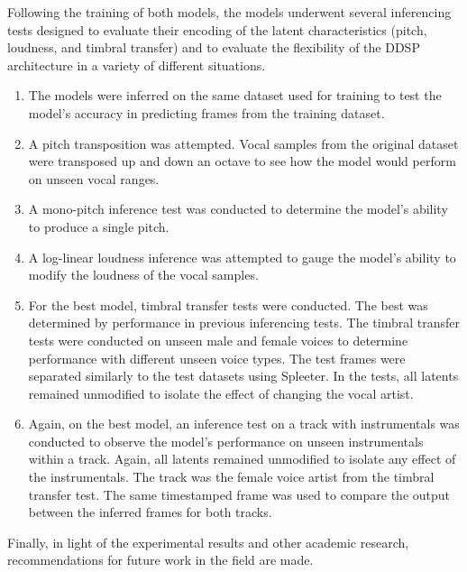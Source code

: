 Following the training of both models, the models underwent several inferencing tests designed to evaluate their encoding of the latent characteristics (pitch, loudness, and timbral transfer) and to evaluate the flexibility of the DDSP architecture in a variety of different situations.

\begin{enumerate}
    \item The models were inferred on the same dataset used for training to test the model's accuracy in predicting frames from the training dataset.
    \item A pitch transposition was attempted. Vocal samples from the original dataset were transposed up and down an octave to see how the model would perform on unseen vocal ranges.
    \item A mono-pitch inference test was conducted to determine the model's ability to produce a single pitch.
    \item A log-linear loudness inference was attempted to gauge the model's ability to modify the loudness of the vocal samples.
    \item For the best model, timbral transfer tests were conducted. The best was determined by performance in previous inferencing tests. The timbral transfer tests were conducted on unseen male and female voices to determine performance with different unseen voice types. The test frames were separated similarly to the test datasets using Spleeter. In the tests, all latents remained unmodified to isolate the effect of changing the vocal artist.
    \item Again, on the best model, an inference test on a track with instrumentals was conducted to observe the model's performance on unseen instrumentals within a track. Again, all latents remained unmodified to isolate any effect of the instrumentals. The track was the female voice artist from the timbral transfer test. The same timestamped frame was used to compare the output between the inferred frames for both tracks.
\end{enumerate}

Finally, in light of the experimental results and other academic research, recommendations for future work in the field are made.